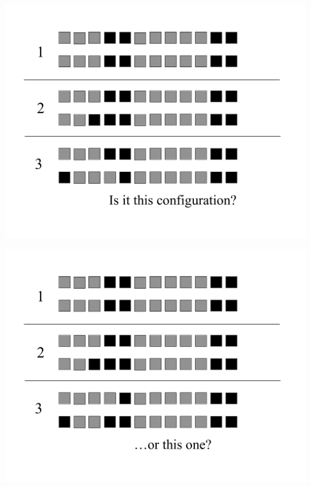 \newslide{}
\mbox{}
\vspace*{\VertUp}
\enlargethispage*{1000pt}
\begin{center}
\includegraphics*[width=\textwidth]{PPT_pages/pg_0017.pdf}
\end{center}


\newslide{}
\mbox{}
\vspace*{\VertUp}
\enlargethispage*{1000pt}
\begin{center}
\includegraphics*[width=\textwidth]{PPT_pages/pg_0018.pdf}
\end{center}


